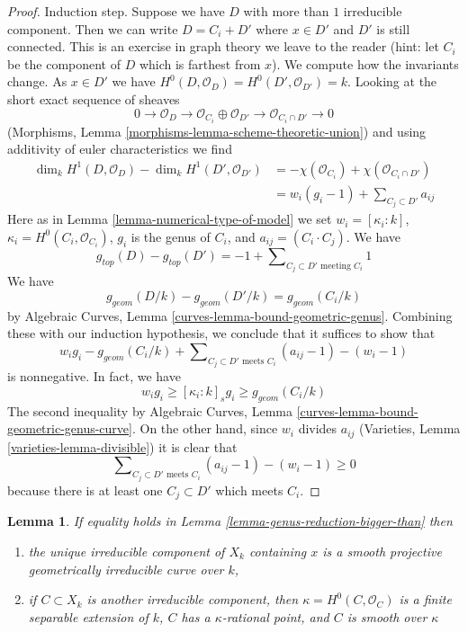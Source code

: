 \documentclass{stacks-project}
\theoremstyle{plain}
\newtheorem{lemma}[subsection]{Lemma}
\theoremstyle{definition}
\theoremstyle{remark}
\numberwithin{equation}{subsection}
\begin{document}
\begin{proof}
\medskip\noindent
Induction step. Suppose we have $D$ with more than $1$ irreducible
component. Then we can write $D = C_i + D'$ where $x \in D'$ and
$D'$ is still connected. This is an exercise in graph theory we leave
to the reader (hint: let $C_i$ be the component of $D$ which is
farthest from $x$). We compute how the invariants change.
As $x \in D'$ we have $H^0(D, \mathcal{O}_D) = H^0(D', \mathcal{O}_{D'}) = k$.
Looking at the short exact sequence of sheaves
$$
0 \to \mathcal{O}_D \to \mathcal{O}_{C_i} \oplus \mathcal{O}_{D'}
\to \mathcal{O}_{C_i \cap D'} \to 0
$$
(Morphisms, Lemma \ref{morphisms-lemma-scheme-theoretic-union})
and using additivity of euler characteristics we find
\begin{align*}
\dim_k H^1(D, \mathcal{O}_D) - \dim_k H^1(D', \mathcal{O}_{D'})
& =
-\chi(\mathcal{O}_{C_i}) + \chi(\mathcal{O}_{C_i \cap D'}) \\
& =
w_i(g_i - 1) + \sum\nolimits_{C_j \subset D'} a_{ij}
\end{align*}
Here as in Lemma \ref{lemma-numerical-type-of-model} we set
$w_i = [\kappa_i : k]$, $\kappa_i = H^0(C_i, \mathcal{O}_{C_i})$,
$g_i$ is the genus of $C_i$, and $a_{ij} = (C_i \cdot C_j)$.
We have
$$
g_{top}(D) - g_{top}(D') = -1 +
\sum\nolimits_{C_j \subset D'\text{ meeting }C_i} 1
$$
We have
$$
g_{geom}(D/k) - g_{geom}(D'/k) = g_{geom}(C_i/k)
$$
by Algebraic Curves, Lemma \ref{curves-lemma-bound-geometric-genus}.
Combining these with our induction hypothesis, we
conclude that it suffices to show that
$$
w_i g_i - g_{geom}(C_i/k) +
\sum\nolimits_{C_j \subset D'\text{ meets } C_i} (a_{ij} - 1) - (w_i - 1)
$$
is nonnegative. In fact, we have
\begin{equation}
\label{equation-genus-change}
w_i g_i \geq [\kappa_i : k]_s g_i \geq g_{geom}(C_i/k)
\end{equation}
The second inequality by
Algebraic Curves, Lemma \ref{curves-lemma-bound-geometric-genus-curve}.
On the other hand, since $w_i$ divides $a_{ij}$
(Varieties, Lemma \ref{varieties-lemma-divisible})
it is clear that
\begin{equation}
\label{equation-change-intersections}
\sum\nolimits_{C_j \subset D'\text{ meets } C_i} (a_{ij} - 1) - (w_i - 1)
\geq 0
\end{equation}
because there is at least one $C_j \subset D'$ which meets $C_i$.
\end{proof}

\begin{lemma}
\label{lemma-equality-genus-reduction-bigger-than}
If equality holds in Lemma \ref{lemma-genus-reduction-bigger-than}
then
\begin{enumerate}
\item the unique irreducible component of $X_k$ containing
$x$ is a smooth projective geometrically irreducible curve
over $k$,
\item if $C \subset X_k$ is another irreducible component, then
$\kappa = H^0(C, \mathcal{O}_C)$ is a finite separable extension
of $k$, $C$ has a $\kappa$-rational point, and $C$ is smooth over $\kappa$
\end{enumerate}
\end{lemma}
\end{document}
